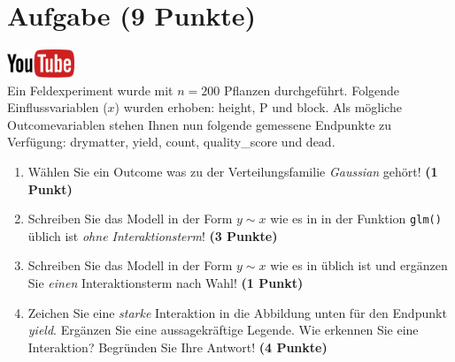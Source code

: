\documentclass[a4paper, 9pt]{scrartcl}\usepackage[]{graphicx}\usepackage[]{xcolor}
\begin{document}
 
\clearpage

\section{Aufgabe \hfill (9 Punkte)}

\hfill\href{https://youtu.be/AwQEcQWLFCw}{\includegraphics[width =
  2cm]{img/youtube}}\\[1Ex]



Ein Feldexperiment wurde mit $n = 200$ Pflanzen durchgef{\"u}hrt. Folgende
Einflussvariablen ($x$) wurden erhoben: height, P und block. Als m{\"o}gliche Outcomevariablen stehen Ihnen nun
folgende gemessene Endpunkte zu Verf{\"u}gung: drymatter, yield, count, quality\_score und dead.

\begin{enumerate}
\item W{\"a}hlen Sie ein Outcome was zu der Verteilungsfamilie
  \textit{Gaussian} geh{\"o}rt! \textbf{(1 Punkt)}
\item Schreiben Sie das Modell in der Form $y \sim x$ wie es in \Rlogo in
  der Funktion \texttt{glm()}
  {\"u}blich ist \textit{ohne Interaktionsterm}! \textbf{(3 Punkte)}
\item Schreiben Sie das Modell in der Form $y \sim x$ wie es in \Rlogo
  {\"u}blich ist und erg{\"a}nzen Sie \textit{einen} Interaktionsterm nach Wahl! \textbf{(1 Punkt)} 
\item Zeichen Sie eine \textit{starke}
  Interaktion in die Abbildung unten f{\"u}r den Endpunkt
  \textit{yield}. Erg{\"a}nzen Sie eine aussagekr{\"a}ftige Legende. Wie erkennen
  Sie eine Interaktion? Begr{\"u}nden Sie Ihre Antwort! \textbf{(4 Punkte)}
\end{enumerate}
\end{document}
